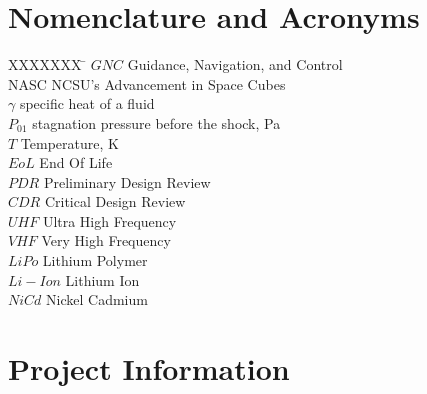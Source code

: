 \section*{Nomenclature and Acronyms}

\begin{tabbing}
  XXXXXXX \= \kill%
  $GNC$ \> Guidance, Navigation, and Control \\
  NASC \> NCSU's Advancement in Space Cubes \\
  $\gamma$ \> specific heat of a fluid \\
  $P_{01}$ \> stagnation pressure before the shock, Pa \\
  $T$ \> Temperature, K  \\
  $EoL$ \> End Of Life \\
  $PDR$ \> Preliminary Design Review \\
  $CDR$ \> Critical Design Review \\
  $UHF$ \> Ultra High Frequency \\
  $VHF$ \> Very High Frequency \\
  $LiPo$ \> Lithium Polymer \\
  $Li-Ion$ \> Lithium Ion \\
  $NiCd$ \> Nickel Cadmium \\
  [5pt]
 \end{tabbing}
 
 \vspace{0.5mm}
\pagebreak
\section{Project Information}
